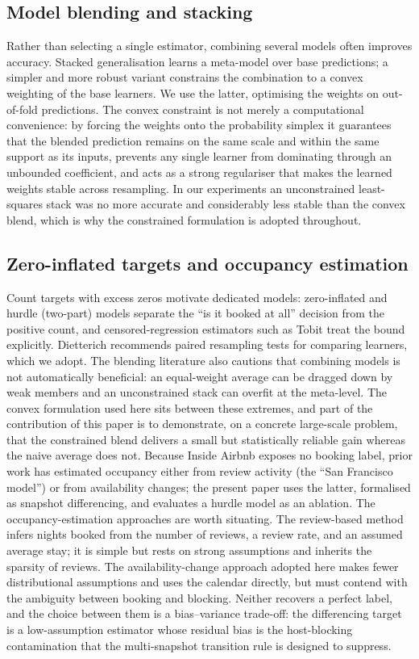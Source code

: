 \documentclass[journal]{IEEEtran}
\begin{document}
\subsection{Model blending and stacking}
Rather than selecting a single estimator, combining several models often improves
accuracy. Stacked generalisation \cite{wolpert1992stacked} learns a meta-model
over base predictions; a simpler and more robust variant constrains the
combination to a convex weighting of the base learners. We use the latter,
optimising the weights on out-of-fold predictions. The convex constraint is not
merely a computational convenience: by forcing the weights onto the probability
simplex it guarantees that the blended prediction remains on the same scale and
within the same support as its inputs, prevents any single learner from dominating
through an unbounded coefficient, and acts as a strong regulariser that makes the
learned weights stable across resampling. In our experiments an unconstrained
least-squares stack was no more accurate and considerably less stable than the
convex blend, which is why the constrained formulation is adopted throughout.

\subsection{Zero-inflated targets and occupancy estimation}
Count targets with excess zeros motivate dedicated models: zero-inflated and
hurdle (two-part) models separate the ``is it booked at all'' decision from the
positive count, and censored-regression estimators such as Tobit \cite{tobin1958}
treat the bound explicitly. Dietterich \cite{dietterich1998} recommends paired
resampling tests for comparing learners, which we adopt. The blending literature also cautions that combining models is not automatically
beneficial: an equal-weight average can be dragged down by weak members and an
unconstrained stack can overfit at the meta-level. The convex formulation used here
sits between these extremes, and part of the contribution of this paper is to
demonstrate, on a concrete large-scale problem, that the constrained blend delivers
a small but statistically reliable gain whereas the naive average does not.
Because Inside Airbnb
exposes no booking label, prior work has estimated occupancy either from
review activity (the ``San Francisco model'') or from availability changes; the
present paper uses the latter, formalised as snapshot differencing, and evaluates
a hurdle model as an ablation. The occupancy-estimation approaches are worth
situating. The review-based method infers nights booked from the number of reviews,
a review rate, and an assumed average stay; it is simple but rests on strong
assumptions and inherits the sparsity of reviews. The availability-change approach
adopted here makes fewer distributional assumptions and uses the calendar directly,
but must contend with the ambiguity between booking and blocking. Neither recovers a
perfect label, and the choice between them is a bias--variance trade-off: the
differencing target is a low-assumption estimator whose residual bias is the
host-blocking contamination that the multi-snapshot transition rule is designed to
suppress.
\end{document}
